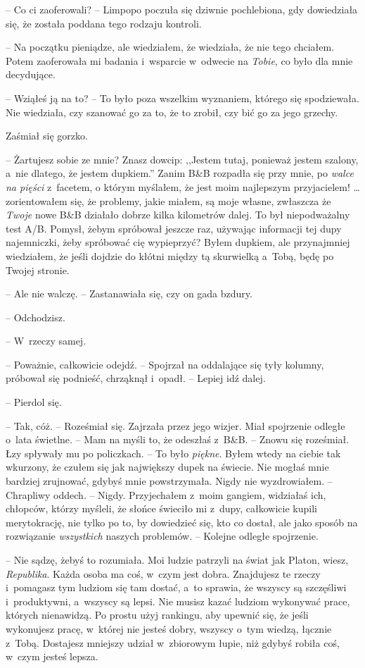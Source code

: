 \documentclass[oneside,polish,11pt,sfheadings]{mwbk}
\begin{document}
-- Co ci zaoferowali? -- Limpopo poczuła się dziwnie pochlebiona, gdy
dowiedziała się, że została poddana tego rodzaju kontroli.

-- Na początku pieniądze, ale wiedziałem, że wiedziała, że nie tego
chciałem. Potem zaoferowała mi badania i~wsparcie w~odwecie na
\textit{Tobie}, co było dla mnie decydujące.

-- Wziąłeś ją na to? -- To było poza wszelkim wyznaniem, którego się
spodziewała. Nie wiedziała, czy szanować go za to, że to zrobił, czy bić
go za jego grzechy.

Zaśmiał się gorzko. 

-- Żartujesz sobie ze mnie? Znasz dowcip: ,,Jestem
tutaj, ponieważ jestem szalony, a~nie dlatego, że jestem dupkiem.''
Zanim B\&B rozpadła się przy mnie, po \textit{walce na pięści} z~facetem,
o którym myślałem, że jest moim najlepszym przyjacielem! \ldots 
zorientowałem się, że problemy, jakie miałem, są moje własne, zwłaszcza
że \textit{Twoje} nowe B\&B działało dobrze kilka kilometrów dalej. To był
niepodważalny test A/B. Pomysł, żebym spróbował jeszcze raz, używając
informacji tej dupy najemniczki, żeby spróbować cię wypieprzyć? Byłem
dupkiem, ale przynajmniej wiedziałem, że jeśli dojdzie do kłótni między
tą skurwielką a~Tobą, będę po Twojej stronie.

-- Ale nie walczę. -- Zastanawiała się, czy on gada bzdury.

-- Odchodzisz.

-- W~rzeczy samej.

-- Poważnie, całkowicie odejdź. -- Spojrzał na oddalające się tyły
kolumny, próbował się podnieść, chrząknął i~opadł. -- Lepiej idź dalej.

-- Pierdol się.

-- Tak, cóż. -- Roześmiał się. Zajrzała przez jego wizjer. Miał spojrzenie
odległe o~lata świetlne. -- Mam na myśli to, że odeszłaś z~B\&B. -- Znowu
się roześmiał. Łzy spływały mu po policzkach. -- To było \textit{piękne}.
Byłem wtedy na ciebie tak wkurzony, że czułem się jak największy dupek
na świecie. Nie mogłaś mnie bardziej zrujnować, gdybyś mnie
powstrzymała. Nigdy nie wyzdrowiałem. -- Chrapliwy oddech. -- Nigdy.
Przyjechałem z~moim gangiem, widziałaś ich, chłopców, którzy myśleli, że
słońce świeciło mi z~dupy, całkowicie kupili merytokrację, nie tylko po
to, by dowiedzieć się, kto co dostał, ale jako sposób na rozwiązanie
\textit{wszystkich }naszych problemów. -- Kolejne odległe spojrzenie.

-- Nie sądzę, żebyś to rozumiała. Moi ludzie patrzyli na świat jak
Platon, wiesz, \textit{Republika}. Każda osoba ma coś, w~czym jest dobra.
Znajdujesz te rzeczy i~pomagasz tym ludziom się tam dostać, a~to
sprawia, że wszyscy są szczęśliwi i~produktywni, a~wszyscy są lepsi. Nie
musisz kazać ludziom wykonywać prace, których nienawidzą. Po prostu użyj
rankingu, aby upewnić się, że jeśli wykonujesz pracę, w~której nie
jesteś dobry, wszyscy o~tym wiedzą, łącznie z~Tobą. Dostajesz mniejszy
udział w~zbiorowym łupie, niż gdybyś robiła coś, w~czym jesteś lepsza.
\end{document}
